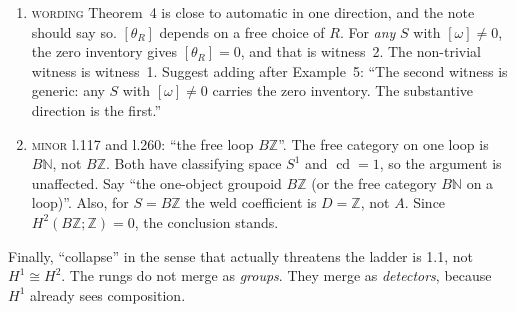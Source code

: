 \documentclass[11pt]{article}
\newcommand{\Z}{\mathbb{Z}}
\newcommand{\N}{\mathbb{N}}
\newcommand{\iss}[1]{\textsc{#1}}
\begin{document}
\begin{enumerate}[label=\textbf{2.\arabic*},leftmargin=*]
\item \iss{wording} Theorem~4 is close to automatic in one direction, and the note should say so.
$[\theta_R]$ depends on a free choice of $R$. For \emph{any} $S$ with $[\omega]\ne0$, the zero
inventory gives $[\theta_R]=0$, and that is witness~2. The non-trivial witness is witness~1.
Suggest adding after Example~5: ``The second witness is generic: any $S$ with $[\omega]\ne0$
carries the zero inventory. The substantive direction is the first.''

\item \iss{minor} l.117 and l.260: ``the free loop $B\Z$''. The free category on one loop is
$B\N$, not $B\Z$. Both have classifying space $S^1$ and $\operatorname{cd}=1$, so the argument is
unaffected. Say ``the one-object groupoid $B\Z$ (or the free category $B\N$ on a loop)''. Also, for
$S=B\Z$ the weld coefficient is $D=\Z$, not $A$. Since $H^2(B\Z;\Z)=0$, the conclusion stands.
\end{enumerate}

Finally, ``collapse'' in the sense that actually threatens the ladder is 1.1, not $H^1\cong H^2$.
The rungs do not merge as \emph{groups}. They merge as \emph{detectors}, because $H^1$ already sees
composition.
\end{document}
